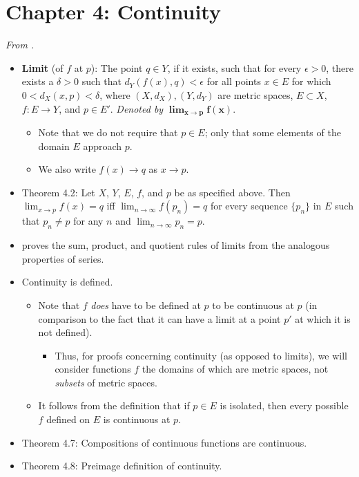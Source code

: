 \documentclass[../../notes.tex]{subfiles}
\begin{document}
\section{Chapter 4: Continuity}
\emph{From \textcite{bib:Rudin}.}
\begin{itemize}
    \item \textbf{Limit} (of $f$ at $p$): The point $q\in Y$, if it exists, such that for every $\epsilon>0$, there exists a $\delta>0$ such that $d_Y(f(x),q)<\epsilon$ for all points $x\in E$ for which $0<d_X(x,p)<\delta$, where $(X,d_X),(Y,d_Y)$ are metric spaces, $E\subset X$, $f:E\to Y$, and $p\in E'$. \emph{Denoted by} $\bm{\lim_{x\to p}f(x)}$.
    \begin{itemize}
        \item Note that we do not require that $p\in E$; only that some elements of the domain $E$ approach $p$.
        \item We also write $f(x)\to q$ as $x\to p$.
    \end{itemize}
    \item Theorem 4.2: Let $X$, $Y$, $E$, $f$, and $p$ be as specified above. Then $\lim_{x\to p}f(x)=q$ iff $\lim_{n\to\infty}f(p_n)=q$ for every sequence $\{p_n\}$ in $E$ such that $p_n\neq p$ for any $n$ and $\lim_{n\to\infty}p_n=p$.
    \item \textcite{bib:Rudin} proves the sum, product, and quotient rules of limits from the analogous properties of series.
    \item Continuity is defined.
    \begin{itemize}
        \item Note that $f$ \emph{does} have to be defined at $p$ to be continuous at $p$ (in comparison to the fact that it can have a limit at a point $p'$ at which it is not defined).
        \begin{itemize}
            \item Thus, for proofs concerning continuity (as opposed to limits), we will consider functions $f$ the domains of which are metric spaces, not \emph{subsets} of metric spaces.
        \end{itemize}
        \item It follows from the definition that if $p\in E$ is isolated, then every possible $f$ defined on $E$ is continuous at $p$.
    \end{itemize}
    \item Theorem 4.7: Compositions of continuous functions are continuous.
    \item Theorem 4.8: Preimage definition of continuity.

\end{itemize}
\end{document}
